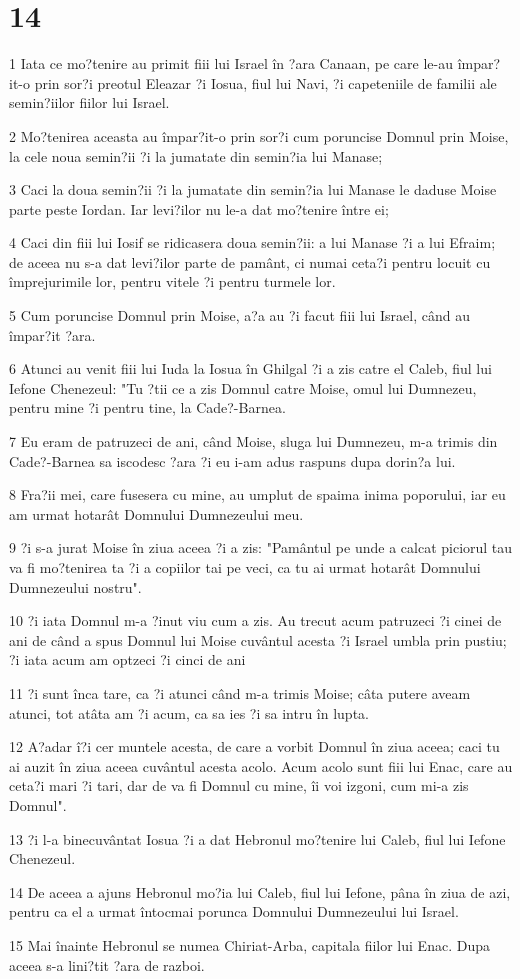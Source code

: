 \chapter{14}

\par 1 Iata ce mo?tenire au primit fiii lui Israel în ?ara Canaan, pe care le-au împar?it-o prin sor?i preotul Eleazar ?i Iosua, fiul lui Navi, ?i capeteniile de familii ale semin?iilor fiilor lui Israel.
\par 2 Mo?tenirea aceasta au împar?it-o prin sor?i cum poruncise Domnul prin Moise, la cele noua semin?ii ?i la jumatate din semin?ia lui Manase;
\par 3 Caci la doua semin?ii ?i la jumatate din semin?ia lui Manase le daduse Moise parte peste Iordan. Iar levi?ilor nu le-a dat mo?tenire între ei;
\par 4 Caci din fiii lui Iosif se ridicasera doua semin?ii: a lui Manase ?i a lui Efraim; de aceea nu s-a dat levi?ilor parte de pamânt, ci numai ceta?i pentru locuit cu împrejurimile lor, pentru vitele ?i pentru turmele lor.
\par 5 Cum poruncise Domnul prin Moise, a?a au ?i facut fiii lui Israel, când au împar?it ?ara.
\par 6 Atunci au venit fiii lui Iuda la Iosua în Ghilgal ?i a zis catre el Caleb, fiul lui Iefone Chenezeul: "Tu ?tii ce a zis Domnul catre Moise, omul lui Dumnezeu, pentru mine ?i pentru tine, la Cade?-Barnea.
\par 7 Eu eram de patruzeci de ani, când Moise, sluga lui Dumnezeu, m-a trimis din Cade?-Barnea sa iscodesc ?ara ?i eu i-am adus raspuns dupa dorin?a lui.
\par 8 Fra?ii mei, care fusesera cu mine, au umplut de spaima inima poporului, iar eu am urmat hotarât Domnului Dumnezeului meu.
\par 9 ?i s-a jurat Moise în ziua aceea ?i a zis: "Pamântul pe unde a calcat piciorul tau va fi mo?tenirea ta ?i a copiilor tai pe veci, ca tu ai urmat hotarât Domnului Dumnezeului nostru".
\par 10 ?i iata Domnul m-a ?inut viu cum a zis. Au trecut acum patruzeci ?i cinei de ani de când a spus Domnul lui Moise cuvântul acesta ?i Israel umbla prin pustiu; ?i iata acum am optzeci ?i cinci de ani
\par 11 ?i sunt înca tare, ca ?i atunci când m-a trimis Moise; câta putere aveam atunci, tot atâta am ?i acum, ca sa ies ?i sa intru în lupta.
\par 12 A?adar î?i cer muntele acesta, de care a vorbit Domnul în ziua aceea; caci tu ai auzit în ziua aceea cuvântul acesta acolo. Acum acolo sunt fiii lui Enac, care au ceta?i mari ?i tari, dar de va fi Domnul cu mine, îi voi izgoni, cum mi-a zis Domnul".
\par 13 ?i l-a binecuvântat Iosua ?i a dat Hebronul mo?tenire lui Caleb, fiul lui Iefone Chenezeul.
\par 14 De aceea a ajuns Hebronul mo?ia lui Caleb, fiul lui Iefone, pâna în ziua de azi, pentru ca el a urmat întocmai porunca Domnului Dumnezeului lui Israel.
\par 15 Mai înainte Hebronul se numea Chiriat-Arba, capitala fiilor lui Enac. Dupa aceea s-a lini?tit ?ara de razboi.

